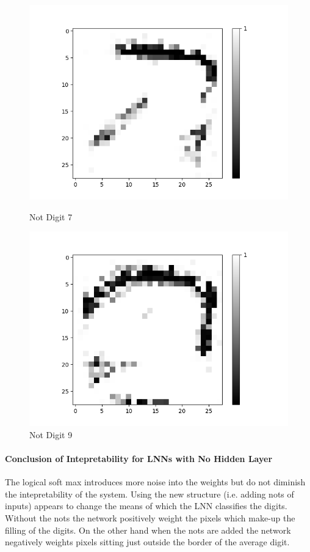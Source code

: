 \begin{figure}[H]
\begin{minipage}[b]{0.19\textwidth}
		\includegraphics[width=\textwidth]{AND(NO-LSM)/Negative/Layer0-Neuron-7.png}
		\caption{Not Digit 7}
		\label{fig:cnf-descrete-generalizatiion}
	\end{minipage}
	\begin{minipage}[b]{0.19\textwidth}
		\includegraphics[width=\textwidth]{AND(NO-LSM)/Negative/Layer0-Neuron-9.png}
		\caption{Not Digit 9}
		\label{fig:cnf-descrete-generalizatiion}
	\end{minipage}
	\hfill
\end{figure}

\paragraph{Conclusion of Intepretability for LNNs with No Hidden Layer}
The logical soft max introduces more noise into the weights but do not diminish the intepretability of the system. Using the new structure (i.e. adding nots of inputs) appears to change the means of which the LNN classifies the digits. Without the nots the network positively weight the pixels which make-up the filling of the digits. On the other hand when the nots are added the network negatively weights pixels sitting just outside the border of the average digit.\\

